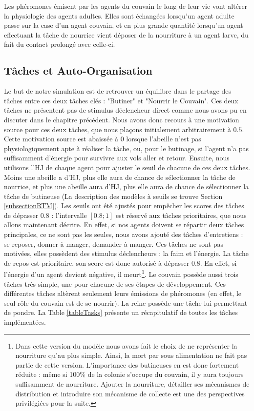 			Les phéromones émisent par les agents du couvain le long de leur vie vont altérer la physiologie des agents adultes. Elles sont échangées lorsqu'un agent adulte passe sur la case d'un agent couvain, et en plus grande quantité lorsqu'un agent effectuant la tâche de nourrice vient déposer de la nourriture à un agent larve, du fait du contact prolongé avec celle-ci.
		
	\subsection{Tâches et Auto-Organisation}
		Le but de notre simulation est de retrouver un équilibre dans le partage des tâches entre ces deux tâches clés : "Butiner" et "Nourrir le Couvain". Ces deux tâches ne présentent pas de stimulus déclencheur direct comme nous avons pu en discuter dans le chapitre précédent. Nous avons donc recours à une motivation source pour ces deux tâches, que nous plaçons initialement arbitrairement à $0.5$. Cette motivation source est abaissée à 0 lorsque l'abeille n'est pas physiologiquement apte à réaliser la tâche, ou, pour le butinage, si l'agent n'a pas suffisamment d'énergie pour survivre aux vols aller et retour. Ensuite, nous utilisons l'HJ de chaque agent pour ajuster le seuil de chacune de ces deux tâches. Moins une abeille a d'HJ, plus elle aura de chance de sélectionner la tâche de nourrice, et plus une abeille aura d'HJ, plus elle aura de chance de sélectionner la tâche de butineuse (La description des modèles à seuils se trouve Section \ref{subsectionRTM}). Les seuils ont été ajustés pour empêcher les scores des tâches de dépasser $0.8$ : l'intervalle $[0.8 ; 1]$ est réservé aux tâches prioritaires, que nous allons maintenant décrire. En effet, si nos agents doivent se répartir deux tâches principales, ce ne sont pas les seules, nous avons ajouté des tâches d'entretiens : se reposer, donner à manger, demander à manger. Ces tâches ne sont pas motivées, elles possèdent des stimulus déclencheurs : la faim et l'énergie. La tâche de repos est prioritaire, son score est donc autorisé à dépasser $0.8$. En effet, si l'énergie d'un agent devient négative, il meurt\footnote{Dans cette version du modèle nous avons fait le choix de ne représenter la nourriture qu'au plus simple. Ainsi, la mort par sous alimentation ne fait pas partie de cette version. L'importance des butineuses en est donc fortement réduite : même si 100\% de la colonie s'occupe du couvain, il y aura toujours suffisamment de nourriture. Ajouter la nourriture, détailler ses mécanismes de distribution et introduire son mécanisme de collecte est une des perspectives privilégiées pour la suite.}. Le couvain possède aussi trois tâches très simple, une pour chacune de ses étapes de développement. Ces différentes tâches altèrent seulement leurs émissions de phéromones (en effet, le seul rôle du couvain est de se nourrir). La reine possède une tâche lui permettant de pondre. La Table \ref{tableTasks} présente un récapitulatif de toutes les tâches implémentées.
		
